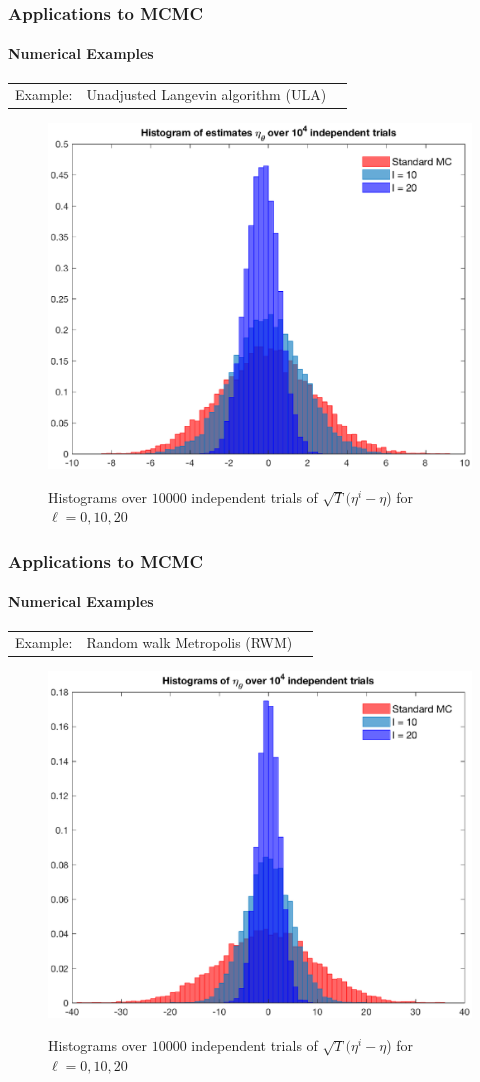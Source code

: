 \documentclass[xcolor=dvipsnames, subsection=false]{beamer}
\def\alertb#1{\alert{\color{BrickRed}  #1}}
\def\alertb#1{\alert{\color{BrickRed}  #1}}
\begin{document}
\begin{frame}
\frametitle{Applications to MCMC}
\framesubtitle{Numerical Examples}
\begin{tabular}{lll}\alertb{Example:}   & Unadjusted Langevin algorithm (ULA)
	\\
\end{tabular}
\begin{figure}[H]
	\begin{center}
		\includegraphics[width = .6\hsize]{hist_all_ds_basis_10000runs_100000samples.eps}
		\label{d_all}
		\tiny
		\caption{Histograms over $10000$ independent trials of $\sqrt{T}(\eta^{i} - \eta$) for $\ell=0,10,20$}
	\end{center}
\end{figure}
\end{frame}

\begin{frame}
\frametitle{Applications to MCMC}
\framesubtitle{Numerical Examples}
\begin{tabular}{lll}\alertb{Example:}   & Random walk Metropolis (RWM)
	\\
\end{tabular}
\begin{figure}[h]
	\begin{center}
		\includegraphics[width = .6\hsize]{hist_mh_all_ds_basis_10000runs_100000samples.eps}
		\label{mh_all}
		\tiny
		\caption{Histograms over $10000$ independent trials of $\sqrt{T}(\eta^{i} - \eta$) for $\ell=0,10,20$}
	\end{center}
\end{figure}
\end{frame}
\end{document}
